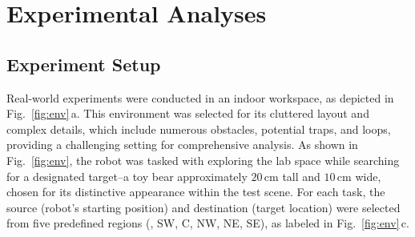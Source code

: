



\section{Experimental Analyses}\label{sec:exp}

\subsection{Experiment Setup}
Real-world experiments were conducted in an indoor workspace, as depicted in Fig.~\ref{fig:env}\,a. This environment was selected for its cluttered layout and complex details, which include numerous obstacles, potential traps, and loops, providing a challenging setting for comprehensive analysis. As shown in Fig.~\ref{fig:env}, the robot was tasked with exploring the lab space while searching for a designated target--a toy bear approximately $20$\,cm tall and $10$\,cm wide, chosen for its distinctive appearance within the test scene. For each task, the source (robot's starting position) and destination (target location) were selected from five predefined regions (\eg, SW, C, NW, NE, SE), as labeled in Fig.~\ref{fig:env}\,c.

